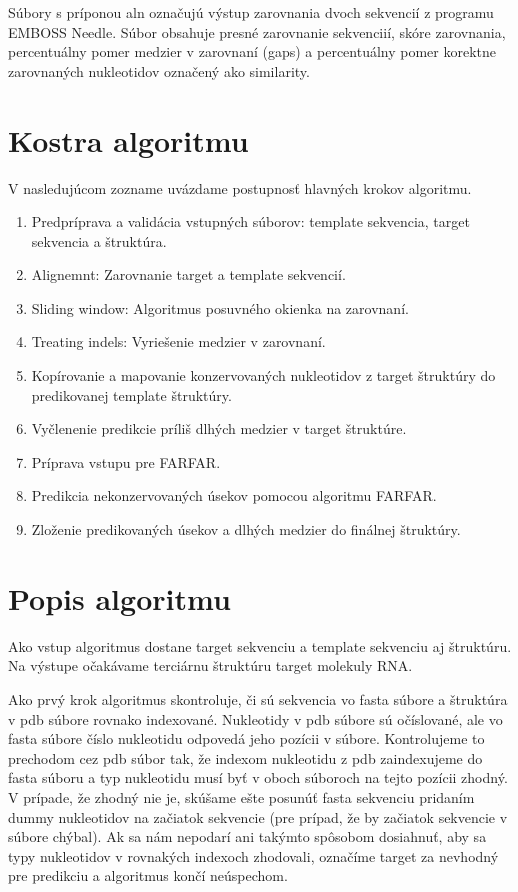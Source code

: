 \indent Súbory s príponou aln označujú výstup zarovnania dvoch sekvencií z programu EMBOSS Needle. Súbor obsahuje presné zarovnanie sekvenciií, skóre zarovnania, percentuálny pomer medzier v zarovnaní (gaps) a percentuálny pomer korektne zarovnaných nukleotidov označený ako similarity. 


\section{Kostra algoritmu}

V nasledujúcom zozname uvázdame postupnosť hlavných krokov algoritmu.\label{3-kostra}
\begin{enumerate}
\item Predpríprava a validácia vstupných súborov: template sekvencia, target sekvencia a štruktúra.
\item Alignemnt: Zarovnanie target a template sekvencií.
\item Sliding window: Algoritmus posuvného okienka na zarovnaní.
\item Treating indels: Vyriešenie medzier v zarovnaní. \label{3-indels}
\item Kopírovanie a mapovanie konzervovaných nukleotidov z target štruktúry do predikovanej template štruktúry. \label{3-map}
\item Vyčlenenie predikcie príliš dlhých medzier v target štruktúre.\label{3-sphere}
\item Príprava vstupu pre FARFAR.
\item Predikcia nekonzervovaných úsekov pomocou algoritmu FARFAR.
\item Zloženie predikovaných úsekov a dlhých medzier do finálnej štruktúry.
\end{enumerate}

\section{Popis algoritmu}
Ako vstup algoritmus dostane target sekvenciu a template sekvenciu aj štruktúru. Na výstupe očakávame terciárnu štruktúru target molekuly RNA.


\indent  Ako prvý krok algoritmus skontroluje, či sú sekvencia vo fasta súbore a štruktúra v pdb súbore rovnako indexované. Nukleotidy v pdb súbore sú očíslované, ale vo fasta súbore číslo nukleotidu odpovedá jeho pozícii v súbore. Kontrolujeme to prechodom cez pdb súbor tak, že indexom nukleotidu z pdb zaindexujeme do fasta súboru a typ nukleotidu musí byť v oboch súboroch na tejto pozícii zhodný. V prípade, že zhodný nie je, skúšame ešte posunúť fasta sekvenciu pridaním dummy nukleotidov na začiatok sekvencie (pre prípad, že by začiatok sekvencie v súbore chýbal). Ak sa nám nepodarí ani takýmto spôsobom dosiahnuť, aby sa typy nukleotidov v rovnakých indexoch zhodovali, označíme target za nevhodný pre predikciu a algoritmus končí neúspechom.



